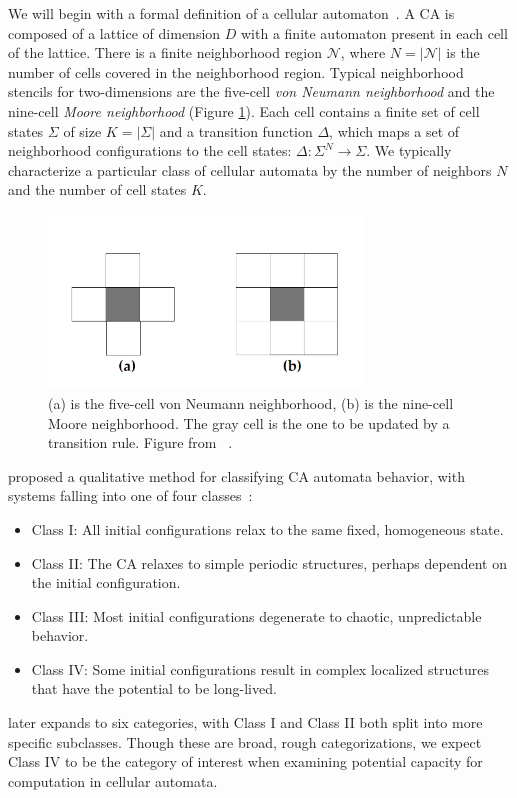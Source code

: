 \documentclass[a4paper,11pt]{report}
\begin{document}
\medskip

We will begin with a formal definition of a cellular automaton~\cite{la90}. A CA is composed of a lattice of dimension $D$ with a finite automaton present in each cell of the lattice. There is a finite neighborhood region $\mathcal{N}$, where $N = |\mathcal{N}|$ is the number of cells covered in the neighborhood region. Typical neighborhood stencils for two-dimensions are the five-cell \textit{von Neumann neighborhood} and the nine-cell \textit{Moore neighborhood} (Figure \ref{fig:neighborhoods}). Each cell contains a finite set of cell states $\Sigma$ of size $K = |\Sigma|$ and a transition function $\Delta$, which maps a set of neighborhood configurations to the cell states: $\Delta: \Sigma^N \to \Sigma$. We typically characterize a particular class of cellular automata by the number of neighbors $N$ and the number of cell states $K$. 

\begin{figure}[thp]
\centering
\includegraphics[width=0.75\textwidth]{mi96_fig3_neighborhoods}
\caption[CA Neighborhood Stencils]{
	(a) is the five-cell von Neumann neighborhood, (b) is the nine-cell Moore neighborhood. The gray cell is the one to be updated by a transition rule. Figure from \citeauthor{mi96}~\cite{mi96}.
}
\label{fig:neighborhoods}
\end{figure}

\medskip

\citeauthor{wf84} proposed a qualitative method for classifying CA automata behavior, with systems falling into one of four classes~\cite{mi96,wf84}:
\begin{itemize}[noitemsep, nolistsep]
\item Class I: All initial configurations relax to the same fixed, homogeneous state.
\item Class II: The CA relaxes to simple periodic structures, perhaps dependent on the initial configuration.
\item Class III: Most initial configurations degenerate to chaotic, unpredictable behavior.
\item Class IV: Some initial configurations result in complex localized structures that have the potential to be long-lived.
\end{itemize}
\citeauthor{li90b} later expands to six categories, with Class I and Class II both split into more specific subclasses. Though these are broad, rough categorizations, we expect Class IV to be the category of interest when examining potential capacity for computation in cellular automata.
\end{document}
